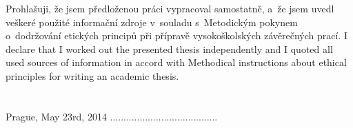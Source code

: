 \startDeclaration
\ifCzech
  Prohlašuji, že jsem předloženou práci vypracoval samostatně,
  a~že jsem uvedl veškeré použité informační zdroje v~souladu
  s~Metodickým pokynem o~dodržování etických principů při přípravě
  vysokoškolských závěrečných prací.
\fi
\ifEnglish
  I declare that I worked out the presented thesis independently
  and I quoted all used sources of information in accord with
  Methodical instructions about ethical principles for writing an
  academic thesis.\\\\\\
  Prague, May 23rd, 2014  \hspace{5.5cm}........................................
\fi
\stopDeclaration

\endinput
